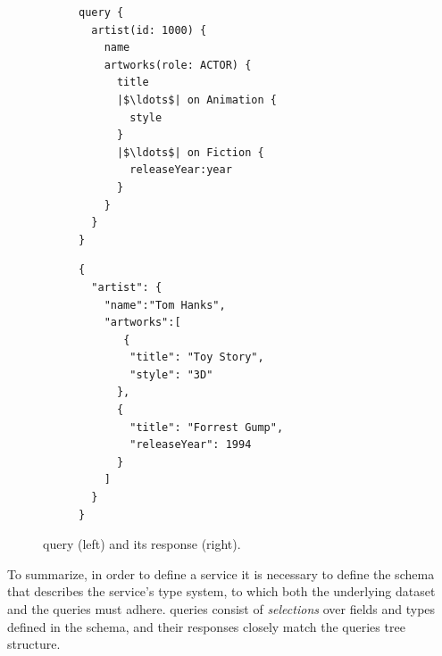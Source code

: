 

\begin{figure}
\centering
\begin{subfigure}{.25\textwidth}
\begin{verbatim}
query {
  artist(id: 1000) {
    name
    artworks(role: ACTOR) {
      title
      |$\ldots$| on Animation {
        style
      }
      |$\ldots$| on Fiction {
        releaseYear:year
      }
    }
  }
}

\end{verbatim}
\label{fig:query_ex}
\end{subfigure}%
\begin{subfigure}{.25\textwidth}
\begin{verbatim}
{
  "artist": {
    "name":"Tom Hanks",
    "artworks":[
       {
        "title": "Toy Story",
        "style": "3D"
      },
      {
        "title": "Forrest Gump",
        "releaseYear": 1994
      }
    ]
  }
}
\end{verbatim}
\label{fig:response_ex}
\end{subfigure}
\caption{\gql query (left) and its response (right).}
\label{fig:qres_ex}
\end{figure}




To summarize,
in order to define a \gql service it is necessary to define the schema that describes the service's type system, 
to which both the underlying dataset and the queries must adhere. \gql queries consist of {\em selections} over fields and types defined in the schema, and their responses closely match the queries tree structure.
